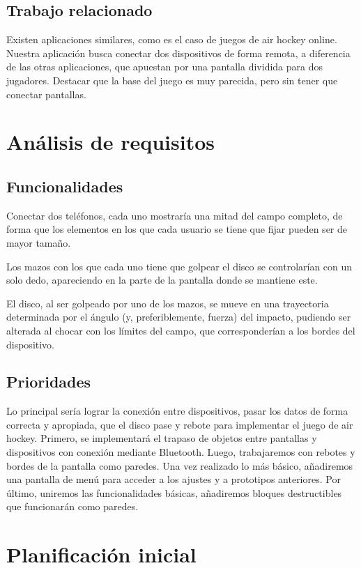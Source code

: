\documentclass[a4paper,openright,12pt]{article}
\begin{document}
\subsection{Trabajo relacionado}
Existen aplicaciones similares, como es el caso de juegos de air hockey online. Nuestra aplicación busca conectar dos dispositivos de forma remota, a diferencia de las otras aplicaciones, que apuestan por una pantalla dividida para dos jugadores. Destacar que la base del juego es muy parecida, pero sin tener que conectar pantallas.

\section{Análisis de requisitos}

\subsection{Funcionalidades}
Conectar dos teléfonos, cada uno mostraría una mitad del campo completo, de forma que los elementos en los que cada usuario se tiene que fijar pueden ser de mayor tamaño.
 
Los mazos con los que cada uno tiene que golpear el disco se controlarían con un solo dedo, apareciendo en la parte de la pantalla donde se mantiene este.
 
El disco, al ser golpeado por uno de los mazos, se mueve en una trayectoria determinada por el ángulo (y, preferiblemente, fuerza) del impacto, pudiendo ser alterada al chocar con los límites del campo, que corresponderían a los bordes del dispositivo.
\subsection{Prioridades}
Lo principal sería lograr la conexión entre dispositivos, pasar los datos de forma correcta y apropiada, que el disco pase y rebote para implementar el juego de air hockey.
Primero, se implementará el trapaso de objetos entre pantallas y dispositivos con conexión mediante Bluetooth.
Luego, trabajaremos con rebotes y bordes de la pantalla como paredes.
Una vez realizado lo más básico, añadiremos una pantalla de menú para acceder a los ajustes y a prototipos anteriores. 
Por último, uniremos las funcionalidades básicas, añadiremos bloques destructibles que funcionarán como paredes.

\section{Planificación inicial}
\end{document}
